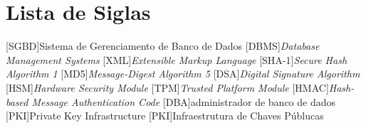 \chapter*{Lista de Siglas}
\begin{acronym}
[SGBD]{Sistema de Gerenciamento de Banco de Dados}
[DBMS]{{\it Database Management Systems}}
[XML]{{\it Extensible Markup Language}}
[SHA-1]{{\it Secure Hash Algorithm 1}}
[MD5]{{\it Message-Digest Algorithm 5}}
[DSA]{{\it Digital Signature Algorithm}}
[HSM]{{\it Hardware Security Module}}
[TPM]{{\it Trusted Platform Module}}
[HMAC]{{\it Hash-based Message Authentication Code}}
[DBA]{administrador de banco de dados}
[PKI]{Private Key Infrastructure}
[PKI]{Infraestrutura de Chaves Públucas}
\end{acronym}
